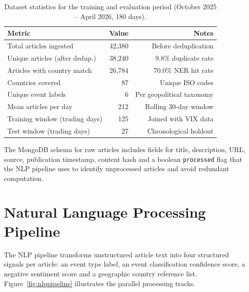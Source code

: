 \documentclass[12pt,a4paper]{report}
\begin{document}
\begin{table}[H]
\centering
\caption{Dataset statistics for the training and evaluation period
  (October 2025 -- April 2026, 180 days).}
\label{tab:dataset_stats}
\begin{tabular}{lrr}
\toprule
\textbf{Metric} & \textbf{Value} & \textbf{Notes} \\
\midrule
Total articles ingested        & 42,380  & Before deduplication \\
Unique articles (after dedup.) & 38,240  & 9.8\% duplicate rate \\
Articles with country match    & 26,784  & 70.0\% NER hit rate \\
Countries covered              & 87      & Unique ISO codes \\
Unique event labels            & 6       & Per geopolitical taxonomy \\
Mean articles per day          & 212     & Rolling 30-day window \\
Training window (trading days) & 125     & Joined with VIX data \\
Test window (trading days)     & 27      & Chronological holdout \\
\bottomrule
\end{tabular}
\end{table}

The MongoDB schema for raw articles includes fields for title, description,
URL, source, publication timestamp, content hash and a boolean
\texttt{processed} flag that the NLP pipeline uses to identify unprocessed
articles and avoid redundant computation.

\section{Natural Language Processing Pipeline}

The NLP pipeline transforms unstructured article text into four structured
signals per article: an event type label, an event classification confidence
score, a negative sentiment score and a geographic country reference list.
Figure~\ref{fig:nlppipeline} illustrates the parallel processing tracks.
\end{document}
